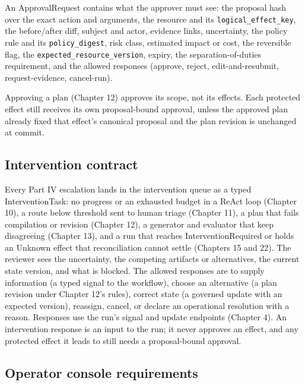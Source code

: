An ApprovalRequest contains what the approver must see: the proposal hash over the exact action and arguments, the resource and its \lstinline[style=bookinline]!logical_effect_key!, the before/after diff, subject and actor, evidence links, uncertainty, the policy rule and its \lstinline[style=bookinline]!policy_digest!, risk class, estimated impact or cost, the reversible flag, the \lstinline[style=bookinline]!expected_resource_version!, expiry, the separation-of-duties requirement, and the allowed responses (approve, reject, edit-and-resubmit, request-evidence, cancel-run).\par

Approving a plan (Chapter 12) approves its scope, not its effects. Each protected effect still receives its own proposal-bound approval, unless the approved plan already fixed that effect's canonical proposal and the plan revision is unchanged at commit.\par

\subsection{Intervention contract}

Every Part IV escalation lands in the intervention queue as a typed InterventionTask: no progress or an exhausted budget in a ReAct loop (Chapter 10), a route below threshold sent to human triage (Chapter 11), a plan that fails compilation or revision (Chapter 12), a generator and evaluator that keep disagreeing (Chapter 13), and a run that reaches InterventionRequired or holds an Unknown effect that reconciliation cannot settle (Chapters 15 and 22). The reviewer sees the uncertainty, the competing artifacts or alternatives, the current state version, and what is blocked. The allowed responses are to supply information (a typed signal to the workflow), choose an alternative (a plan revision under Chapter 12's rules), correct state (a governed update with an expected version), reassign, cancel, or declare an operational resolution with a reason. Responses use the run's signal and update endpoints (Chapter 4). An intervention response is an input to the run; it never approves an effect, and any protected effect it leads to still needs a proposal-bound approval.\par

\subsection{Operator console requirements}

